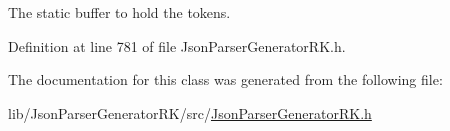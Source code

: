 The static buffer to hold the tokens. 



Definition at line 781 of file Json\+Parser\+Generator\+R\+K.\+h.



The documentation for this class was generated from the following file\+:\begin{DoxyCompactItemize}
\item 
lib/\+Json\+Parser\+Generator\+R\+K/src/\hyperlink{_json_parser_generator_r_k_8h}{Json\+Parser\+Generator\+R\+K.\+h}\end{DoxyCompactItemize}
